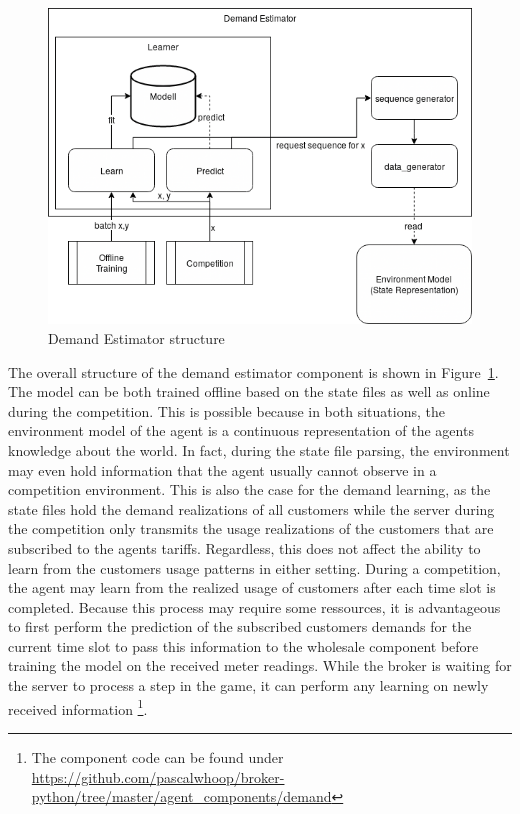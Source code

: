 \begin{figure}[h] \centering \includegraphics[width=0.8\linewidth]{img/UsageEstimator.png} \caption{Demand Estimator
structure} \label{fig:DemandEstimator} \end{figure}


The overall structure of the demand estimator component is shown in Figure~\ref{fig:DemandEstimator}. The model can be
both trained offline based on the state files as well as online during the competition. This is possible because in both
situations, the environment model of the agent is a continuous representation of the agents knowledge about the world.
In fact, during the state file parsing, the environment may even hold information that the agent usually cannot observe
in a competition environment. This is also the case for the demand learning, as the state files hold the demand
realizations of all customers while the server during the competition only transmits the usage realizations of the
customers that are subscribed to the agents tariffs. Regardless, this does not affect the ability to learn from the
customers usage patterns in either setting. During a competition, the agent may learn from the realized usage of
customers after each time slot is completed. Because this process may require some ressources, it is advantageous to
first perform the prediction of the subscribed customers demands for the current time slot to pass this information to
the wholesale component before training the model on the received meter readings. While the broker is waiting for the
server to process a step in the game, it can perform any learning on newly received information \footnote{The component code can be
found under \url{https://github.com/pascalwhoop/broker-python/tree/master/agent_components/demand}}.

